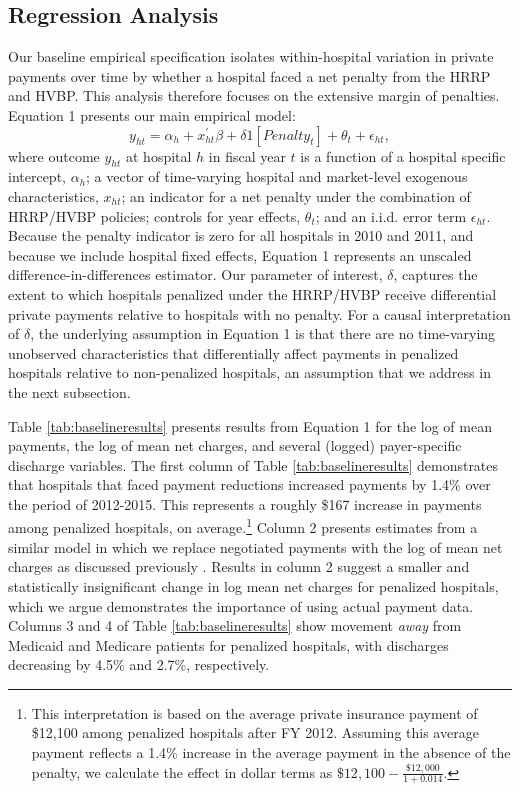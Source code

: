 \documentclass[12pt]{article}
\begin{document}
\subsection{Regression Analysis}
Our baseline empirical specification isolates within-hospital variation in private payments over time by whether a hospital faced a net penalty from the HRRP and HVBP. This analysis therefore focuses on the extensive margin of penalties.  Equation 1 presents our main empirical model:
\begin{equation}
\label{eq: reg}
y_{ht} = \alpha_{h} + x^{'}_{ht}\beta + \delta1[Penalty_{t}]  + \theta_{t}  +  \epsilon_{ht},
\end{equation}
where outcome $y_{ht}$ at hospital $h$ in fiscal year $t$ is a function of a hospital specific intercept, $\alpha_{h}$; a vector of time-varying hospital and market-level exogenous characteristics, $x_{ht}$; an indicator for a net penalty under the combination of HRRP/HVBP policies; controls for year effects, $\theta_t$; and an i.i.d. error term $\epsilon_{ht}$.  Because the penalty indicator is zero for all hospitals in 2010 and 2011, and because we include hospital fixed effects, Equation 1 represents an unscaled difference-in-differences estimator. Our parameter of interest, $\delta$, captures the extent to which hospitals penalized under the HRRP/HVBP receive differential private payments relative to hospitals with no penalty.  For a causal interpretation of $\delta$, the underlying assumption in Equation 1 is that there are no time-varying unobserved characteristics that differentially affect payments in penalized hospitals relative to non-penalized hospitals, an assumption that we address in the next subsection.

Table \ref{tab:baselineresults} presents results from Equation 1 for the log of mean payments, the log of mean net charges, and several (logged) payer-specific discharge variables. The first column of Table \ref{tab:baselineresults} demonstrates that hospitals that faced payment reductions increased payments by 1.4\% over the period of 2012-2015.  This represents a roughly \$167 increase in payments among penalized hospitals, on average.\footnote{This interpretation is based on the average private insurance payment of \$12,100 among penalized hospitals after FY 2012. Assuming this average payment reflects a 1.4\% increase in the average payment in the absence of the penalty, we calculate the effect in dollar terms as $\$12,100 - \frac{\$12,000}{1+0.014}$.} Column 2 presents estimates from a similar model in which we replace negotiated payments with the log of mean net charges as discussed previously \citep{dafny2009,lewis2015,schmitt2017,dranove2017}. Results in column 2 suggest a smaller and statistically insignificant change in log mean net charges for penalized hospitals, which we argue demonstrates the importance of using actual payment data.  Columns 3 and 4 of Table \ref{tab:baselineresults} show movement \textit{away} from Medicaid and Medicare patients for penalized hospitals, with discharges decreasing by 4.5\% and 2.7\%, respectively.
\end{document}
